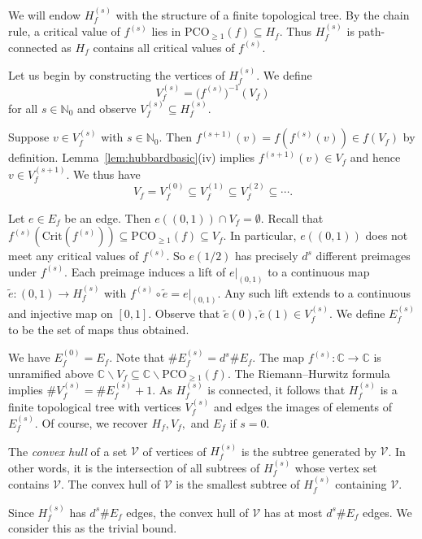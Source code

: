 \documentclass[12pt,oneside,a4]{amsart}
\newcommand{\IC}{\mathbb{C}}
\newcommand{\IN}{\mathbb{N}}
\newcommand{\cV}{\mathcal{V}}
\numberwithin{maincounter}{section}
\numberwithin{equation}{section}
\renewcommand{\subset}{\subseteq}
\newcommand{\ssm}{\smallsetminus}
\newcommand{\crit}[1]{\mathrm{Crit}({#1})}
\newcommand{\pco}{\mathrm{PCO}}
\begin{document}
We will endow $H_f^{(s)}$ with the structure of
a finite topological tree. By
the chain rule, a critical value of $f^{(s)}$ lies in $\pco_{\ge
1}(f)\subset H_f$. Thus $H_f^{(s)}$ is path-connected as $H_f$
contains all critical values of $f^{(s)}$. 

Let us begin by constructing the vertices of $H_f^{(s)}$. 
We define
\begin{equation}
  \label{def:Vfs}
  V_f^{(s)} = \bigl(f^{(s)}\bigr)^{-1}(V_f) 
\end{equation}
for all $s\in\IN_0$ and observe $V_f^{(s)} \subset H_f^{(s)}$. 

Suppose $v\in V_f^{(s)}$ with $s\in\IN_0$. Then $f^{(s+1)}(v)
=f(f^{(s)}(v)) \in f(V_f)$ by definition. Lemma~\ref{lem:hubbardbasic}(iv) implies
$f^{(s+1)}(v)\in V_f$ and hence $v \in V_f^{(s+1)}$. We thus have 
\begin{equation}
  \label{eq:Vfchain}
  V_f = V_f^{(0)} \subset V_f^{(1)}\subset V_f^{(2)}\subset \cdots. 
\end{equation}

Let $e \in E_f$ be an edge. Then $e((0,1)) \cap V_f=\emptyset$. Recall
that $f^{(s)}(\crit{f^{(s)}})\subset \pco_{\ge 1}(f) \subset V_f$. In
particular, $e((0,1))$ does not meet any critical values of $f^{(s)}$.
So $e(1/2)$ has precisely $d^s$ different preimages under $f^{(s)}$.
Each preimage induces a lift of 
$e|_{(0,1)}$  to a continuous map
$\tilde e \colon (0,1)\rightarrow H_f^{(s)}$ with $f^{(s)} \circ
\tilde e = e|_{(0,1)}$. Any such lift extends to a continuous and
injective map on $[0,1]$. Observe that $\tilde e(0),\tilde e(1) \in
V_f^{(s)}$. We define $E_f^{(s)}$ to be the set of maps thus obtained.

We have $E_f^{(0)}=E_f$. Note that $\# E_f^{(s)} = d^s \# E_f$. The
map $f^{(s)}\colon \IC\rightarrow\IC$ is unramified above $\IC\ssm
V_f\subset \IC\ssm \pco_{\ge 1}(f)$. The Riemann--Hurwitz formula
implies $\# V_f^{(s)} = \# E_f^{(s)}+1$. As $H_f^{(s)}$ is connected,
it
follows that $H_f^{(s)}$
is a finite topological tree with vertices $V_f^{(s)}$ and edges the
images of elements of $E_f^{(s)}$. Of course, we recover $H_f,V_f,$
and $E_f$ if $s=0$.

The \textit{convex hull} of a set $\cV$ of vertices of $H_f^{(s)}$ is the
subtree generated by $\cV$. In other words, it is the intersection of all subtrees of
$H_f^{(s)}$ whose vertex set contains $\cV$. The convex hull of $\cV$
is the smallest subtree of
$H_f^{(s)}$ containing $\cV$.

Since $H_f^{(s)}$ has $d^s \# E_f $ edges, the convex hull of $\cV$
has at most $ d^s \# E_f$ edges. We consider this as the trivial bound. 
\end{document}
